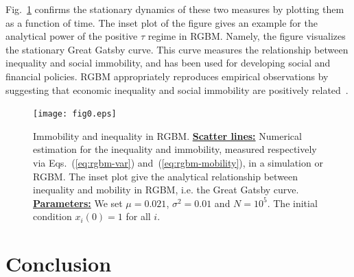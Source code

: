 \documentclass[11pt]{article}
\numberwithin{equation}{section}
\begin{document}
Fig.~\ref{fig:rgbm-ineq-mobility} confirms the stationary dynamics of these two measures by plotting them as a function of time. The inset plot of the figure gives an example for the analytical power of the positive $\tau$ regime in RGBM. Namely, the figure visualizes the stationary Great Gatsby curve. This curve measures the relationship between inequality and social immobility, and has been used for developing social and financial policies. RGBM appropriately reproduces empirical observations by suggesting that economic inequality and social immobility are positively related~\cite{krueger2012rise}.

\begin{figure}[t!]
\texttt{[image: fig0.eps]}
\caption{Immobility and inequality in RGBM. \underline{\textbf{Scatter lines:}} Numerical estimation for the inequality and immobility, measured respectively via Eqs.~(\ref{eq:rgbm-var}) and~(\ref{eq:rgbm-mobility}), in a simulation or RGBM. The inset plot give the analytical relationship between inequality and mobility in RGBM, i.e. the Great Gatsby curve. \underline{\textbf{Parameters:}} We set $\mu = 0.021$, $\sigma^2 = 0.01$ and $N = 10^5$. The initial condition $x_i(0) = 1$ for all $i$.\label{fig:rgbm-ineq-mobility}}
\end{figure}

\section{Conclusion}\label{sec:conclusion}

\end{document}
